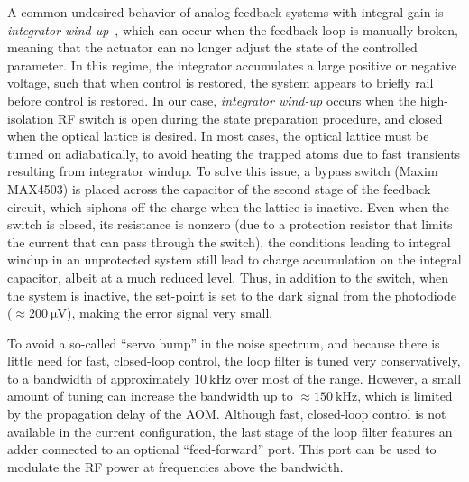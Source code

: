 \documentclass[twocolumn,aps,pra,showpacs,preprintnumbers,bibnotes]{revtex4-1}
\newcommand\unit[2]{\ensuremath{#1~\mathrm{{#2}}}}
\begin{document}
A common undesired behavior of analog feedback systems with integral gain is \emph{integrator wind-up}~\cite{Bechhoefer2005}, which can occur when the feedback loop is manually broken, meaning that the actuator can no longer adjust the state of the controlled parameter.
In this regime, the integrator accumulates a large positive or negative voltage, such that when control is restored, the system appears to briefly rail before control is restored.
In our case, \emph{integrator wind-up} occurs when the high-isolation RF switch is open during the state preparation procedure, and closed when the optical lattice is desired.
In most cases, the optical lattice must be turned on adiabatically, to avoid heating the trapped atoms due to fast transients resulting from integrator windup.
To solve this issue, a bypass switch (Maxim MAX4503) is placed across the capacitor of the second stage of the feedback circuit, which siphons off the charge when the lattice is inactive.
Even when the switch is closed, its resistance is nonzero (due to a protection resistor that limits the current that can pass through the switch), the conditions leading to integral windup in an unprotected system still lead to charge accumulation on the integral capacitor, albeit at a much reduced level.
Thus, in addition to the switch, when the system is inactive, the set-point is set to the dark signal from the photodiode ($\approx$\unit{200}{\mu{}V}), making the error signal very small.

To avoid a so-called ``servo bump'' in the noise spectrum, and because there is little need for fast, closed-loop control, the loop filter is tuned very conservatively, to a bandwidth of approximately \unit{10}{kHz} over most of the range.
However, a small amount of tuning can increase the bandwidth up to $\approx$\unit{150}{kHz}, which is limited by the propagation delay of the AOM.
Although fast, closed-loop control is not available in the current configuration, the last stage of the loop filter features an adder connected to an optional ``feed-forward'' port.
This port can be used to modulate the RF power at frequencies above the bandwidth.
\end{document}
